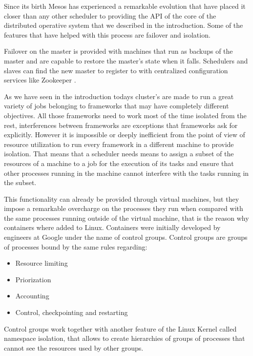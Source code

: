 \documentclass{report}                     %
\begin{document}
Since its birth Mesos has experienced a remarkable evolution that have
placed it closer than any other scheduler to providing the API of the
core of the distributed operative system that we described in the
introduction. Some of the features that have helped with this process
are failover and isolation.

Failover on the master is provided with machines that run as backups of the master and
are capable to restore the master's state when it falls. Schedulers and slaves can find
the new master to register to with centralized configuration services like Zookeeper \cite{_apache_????}.

As we have seen in the introduction todays cluster's are made to run a
great variety of jobs belonging to frameworks that may have completely
different objectives. All those frameworks need to work most of the
time isolated from the rest, interferences between frameworks are
exceptions that frameworks ask for explicitly. However it is
impossible or deeply inefficient from the point of view of resource
utilization to run every framework in a different machine to provide
isolation. That means that a scheduler needs means to assign a subset
of the resources of a machine to a job for the execution of its tasks
and ensure that other processes running in the machine cannot
interfere with the tasks running in the subset.

This functionality can already be provided through virtual machines,
but they impose a remarkable overcharge on the processes they run when
compared with the same processes running outside of the virtual
machine, that is the reason why containers where added to
Linux. Containers were initially developed by engineers at Google
under the name of control groups. Control groups are groups of
processes bound by the same rules regarding: \\

\begin{itemize}
  \item Resource limiting
  \item Priorization
  \item Accounting
  \item Control, checkpointing and restarting
\end{itemize}

Control groups work together with another feature of the Linux Kernel
called namespace isolation, that allows to create hierarchies of
groups of processes that cannot see the resources used by other
groups.
\end{document}
